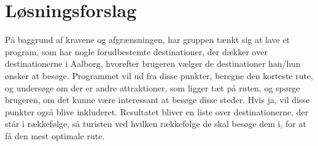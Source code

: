 \section{Løsningsforslag}
På baggrund af kravene og afgrænsningen, har gruppen tænkt sig at lave et program, som har nogle forudbestemte destinationer, der dækker over destinationerne i Aalborg, hvorefter brugeren vælger de destinationer han/hun ønsker at besøge. Programmet vil ud fra disse punkter, beregne den korteste rute, og undersøge om der er andre attraktioner, som ligger tæt på ruten, og spørge brugeren, om det kunne være interessant at besøge disse steder. Hvis ja, vil disse punkter også blive inkluderet. Resultatet bliver en liste over destinationerne, der står i rækkefølge, så turisten ved hvilken rækkefølge de skal besøge dem i, for at få den mest optimale rute.

